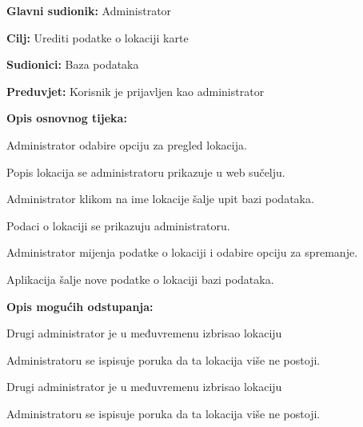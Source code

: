 				\noindent {}
				\begin{packed_item}
					
					\item \textbf{Glavni sudionik: }Administrator
					\item  \textbf{Cilj:} Urediti podatke o lokaciji karte
					\item  \textbf{Sudionici:} Baza podataka
					\item  \textbf{Preduvjet:} Korisnik je prijavljen kao administrator
					\item  \textbf{Opis osnovnog tijeka:}
					
					\item[] \begin{packed_enum}
						
						\item Administrator odabire opciju za pregled lokacija.
						\item Popis lokacija se administratoru prikazuje u web sučelju.
						\item Administrator klikom na ime lokacije šalje upit bazi podataka.
						\item Podaci o lokaciji se prikazuju administratoru.
						\item Administrator mijenja podatke o lokaciji i odabire opciju za spremanje.
						\item Aplikacija šalje nove podatke o lokaciji bazi podataka.
					\end{packed_enum}
					
					\item  \textbf{Opis mogućih odstupanja:}
					
					\item[] \begin{packed_item}
						
						\item[3.a] Drugi administrator je u međuvremenu izbrisao lokaciju
						\item[] \begin{packed_enum}
							
							\item Administratoru se ispisuje poruka da ta lokacija više ne postoji.
							
						\end{packed_enum}
						\item[6.a] Drugi administrator je u međuvremenu izbrisao lokaciju
						\item[] \begin{packed_enum}
							
							\item Administratoru se ispisuje poruka da ta lokacija više ne postoji.
							
						\end{packed_enum}
						
					\end{packed_item}
				\end{packed_item}
				
